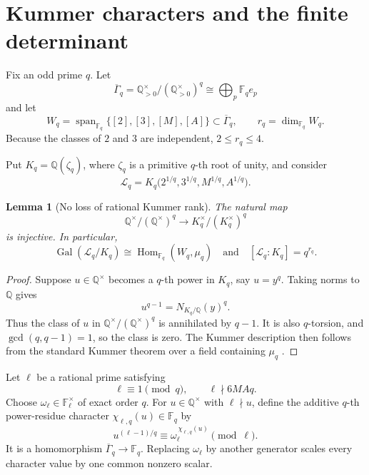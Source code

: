 \documentclass[11pt]{article}
\numberwithin{equation}{section}
\newtheorem{lemma}[theorem]{Lemma}
\theoremstyle{definition}
\theoremstyle{remark}
\newcommand{\Q}{\mathbb Q}
\newcommand{\F}{\mathbb F}
\newcommand{\Gal}{\operatorname{Gal}}
\newcommand{\Span}{\operatorname{span}}
\begin{document}
\section{Kummer characters and the finite determinant}
\label{sec:kummer}

Fix an odd prime \(q\).  Let
\[
 \overline\Gamma_q=\Q_{>0}^{\times}/(\Q_{>0}^{\times})^q
 \cong\bigoplus_p\F_q e_p
\]
and let
\begin{equation}
 W_q=\Span_{\F_q}\bigl\{[2],[3],[M],[A]\bigr\}
 \subset\overline\Gamma_q,
 \qquad r_q=\dim_{\F_q}W_q.\label{eq:Wq}
\end{equation}
Because the classes of \(2\) and \(3\) are independent, \(2\le r_q\le4\).

Put \(K_q=\Q(\zeta_q)\), where \(\zeta_q\) is a primitive \(q\)-th root of unity, and
consider
\begin{equation}
 \mathcal L_q
 =K_q\bigl(2^{1/q},3^{1/q},M^{1/q},A^{1/q}\bigr).\label{eq:Lq}
\end{equation}

\begin{lemma}[No loss of rational Kummer rank]
\label{lem:injection}
The natural map
\[
 \Q^{\times}/(\Q^{\times})^q\longrightarrow K_q^{\times}/(K_q^{\times})^q
\]
is injective.  In particular,
\begin{equation}
 \Gal(\mathcal L_q/K_q)\cong\operatorname{Hom}_{\F_q}(W_q,\mu_q)
 \quad\text{and}\quad
 [\mathcal L_q:K_q]=q^{r_q}.\label{eq:kummergal}
\end{equation}
\end{lemma}

\begin{proof}
Suppose \(u\in\Q^\times\) becomes a \(q\)-th power in \(K_q\), say \(u=y^q\).  Taking
norms to \(\Q\) gives
\[
 u^{q-1}=N_{K_q/\Q}(y)^q.
\]
Thus the class of \(u\) in \(\Q^\times/(\Q^\times)^q\) is annihilated by \(q-1\).  It is
also \(q\)-torsion, and \(\gcd(q,q-1)=1\), so the class is zero.  The Kummer description
then follows from the standard Kummer theorem over a field containing \(\mu_q\)
\cite{MilneFT}.
\end{proof}

Let \(\ell\) be a rational prime satisfying
\[
 \ell\equiv1\pmod q,
 \qquad \ell\nmid 6MAq.
\]
Choose \(\omega_\ell\in\F_\ell^\times\) of exact order \(q\).  For
\(u\in\Q^\times\) with \(\ell\nmid u\), define the additive \(q\)-th power-residue
character \(\chi_{\ell,q}(u)\in\F_q\) by
\begin{equation}
 u^{(\ell-1)/q}\equiv
 \omega_\ell^{\,\chi_{\ell,q}(u)}\pmod\ell.\label{eq:qchar}
\end{equation}
It is a homomorphism \(\overline\Gamma_q\to\F_q\).  Replacing \(\omega_\ell\) by another
generator scales every character value by one common nonzero scalar.
\end{document}

